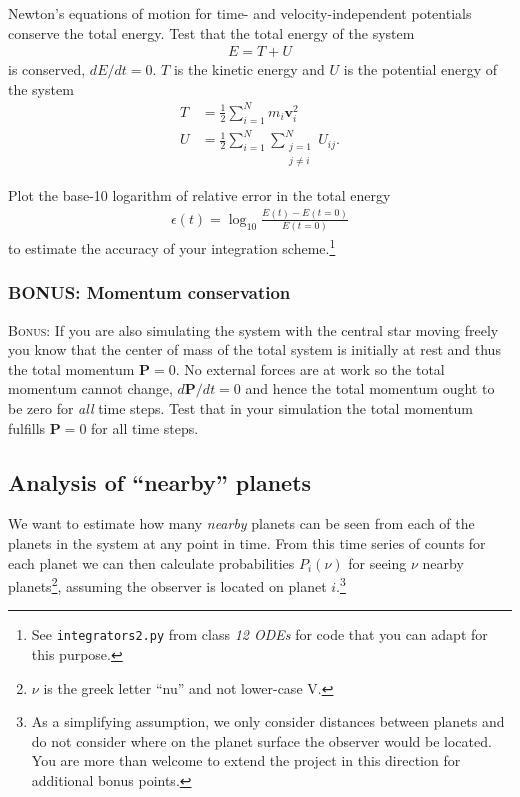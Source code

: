\documentclass[letterpaper]{scrartcl}
\newcommand{\BONUS}{\textsc{Bonus: }}
\renewcommand{\vec}[1]{\ensuremath{\mathbf{#1}}}
\begin{document}
Newton's equations of motion for time- and velocity-independent
potentials conserve the total energy. Test that the total energy of
the system
\begin{gather}
  \label{eq:energy}
  E = T + U
\end{gather}
is conserved, $dE/dt = 0$. $T$ is the kinetic energy and $U$ is the
potential energy of the system
\begin{align}
  \label{eq:KE}
  T &= \frac{1}{2} \sum_{i=1}^{N} m_{i} \vec{v}_{i}^{2}\\
  \label{eq:PE}
  U &= \frac{1}{2}\sum_{i=1}^{N}\sum_{\substack{j=1\\j \neq i}}^{N} U_{ij}.
\end{align}

Plot the base-10 logarithm of relative error in the total energy 
\begin{gather}
  \label{eq:energyaccuracy}
  \epsilon(t) = \log_{10} \frac{E(t) - E(t=0)}{E(t=0)} 
\end{gather}
to estimate the accuracy of your integration scheme.\footnote{See
  \texttt{integrators2.py} from class \emph{12 ODEs} for code that you
  can adapt for this purpose.}

\subsubsection{BONUS: Momentum conservation}
\label{sec:momentum}

\BONUS If you are also simulating the system with the central star
moving freely you know that the center of mass of the total system is
initially at rest and thus the total momentum $\vec{P}=0$. No external
forces are at work so the total momentum cannot change,
$d\vec{P}/dt = 0$ and hence the total momentum ought to be zero for
\emph{all} time steps. Test that in your simulation the total momentum
fulfills $\vec{P} = 0$ for all time steps.


\subsection{Analysis of ``nearby'' planets}
\label{sec:nearby}

We want to estimate how many \emph{nearby} planets can be seen from
each of the planets in the system at any point in time. From this time
series of counts for each planet we can then calculate probabilities
$P_{i}(\nu)$ for seeing $\nu$ nearby planets\footnote{$\nu$ is the
  greek letter ``nu'' and not lower-case V.}, assuming the observer is
located on planet $i$.\footnote{As a simplifying assumption, we only
  consider distances between planets and do not consider where on the
  planet surface the observer would be located. You are more than
  welcome to extend the project in this direction for additional bonus
  points.}
\end{document}
